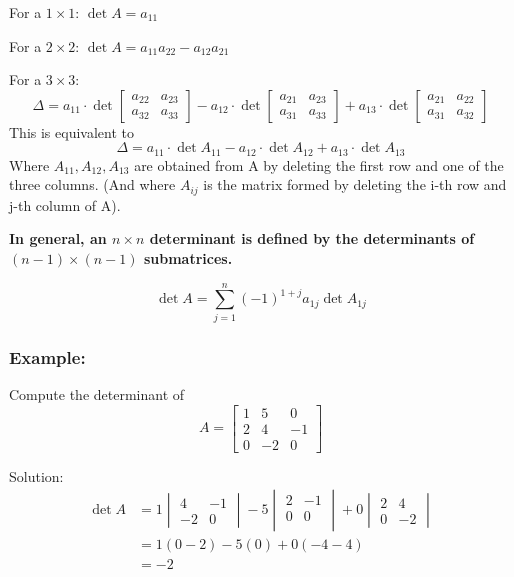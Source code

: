\documentclass[12pt]{article} %
\begin{document}
For a $1 \times 1$: $\det A = a_{11}$

For a $2 \times 2$: $\det A = a_{11}a_{22} - a_{12}a_{21}$

For a $3 \times 3$:
$$\Delta = a_{11} \cdot \det 
\begin{bmatrix}
	a_{22} & a_{23}\\ 
	a_{32} & a_{33}
\end{bmatrix} - a_{12} \cdot \det \begin{bmatrix}
	a_{21} & a_{23}\\ 
	a_{31} & a_{33}
\end{bmatrix} + a_{13} \cdot \det \begin{bmatrix}
	a_{21} & a_{22}\\ 
	a_{31} & a_{32}
\end{bmatrix}$$
This is equivalent to 
$$\Delta = a_11 \cdot \det A_{11} - a_{12} \cdot \det A_{12} + a_{13} \cdot \det A_{13}$$
Where $A_{11}, A_{12}, A_{13}$ are obtained from A by deleting the first row and one of the three columns. (And where $A_{ij}$ is the matrix formed by deleting the i-th row and j-th column of A).

\textbf{In general, an $n \times n$ determinant is defined by the determinants of $(n - 1) \times (n - 1)$ submatrices.}

$$\det A = \sum_{j=1}^n (-1)^{1 + j} a_{1j} \det A_{1j}$$

\subsubsection{Example:}
Compute the determinant of 
$$A = \begin{bmatrix}
	1 & 5 & 0\\
	2 & 4 & -1\\
	0 & -2 & 0
\end{bmatrix}$$

Solution:
\begin{align*}
	\det A &= 1 \begin{vmatrix}
		4 & -1\\
		-2 & 0
	\end{vmatrix} - 5 \begin{vmatrix}
		2 & -1\\
		0 & 0\\
	\end{vmatrix} + 0 \begin{vmatrix}
		2 & 4\\
		0 & -2
	\end{vmatrix}\\
	&= 1(0 - 2) - 5(0) + 0(-4 - 4)\\
	&= -2
\end{align*}
\end{document}
